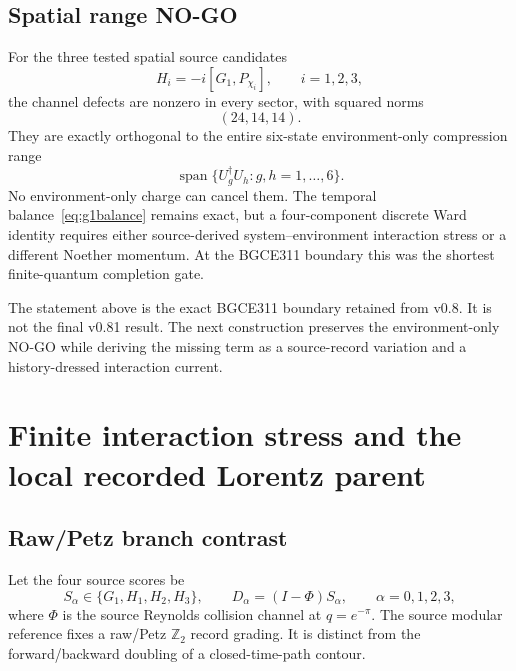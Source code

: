 \documentclass[11pt]{article}
\theoremstyle{definition}
\theoremstyle{remark}
\begin{document}
\subsection{Spatial range NO-GO}

For the three tested spatial source candidates
\begin{equation}
 H_i=-i[G_1,P_{\chi_i}],\qquad i=1,2,3,
\end{equation}
the channel defects are nonzero in every sector, with squared norms
\begin{equation}
 (24,14,14).
\end{equation}
They are exactly orthogonal to the entire six-state environment-only compression range
\begin{equation}
 \operatorname{span}\{U_g^{\dagger}U_h:g,h=1,\ldots,6\}.
\end{equation}
No environment-only charge can cancel them. The temporal balance~\eqref{eq:g1balance} remains exact, but a four-component discrete Ward identity requires either source-derived system--environment interaction stress or a different Noether momentum. At the BGCE311 boundary this was the shortest finite-quantum completion gate.

The statement above is the exact BGCE311 boundary retained from v0.8. It is not the final v0.81 result. The next construction preserves the environment-only NO-GO while deriving the missing term as a source-record variation and a history-dressed interaction current.

\section{Finite interaction stress and the local recorded Lorentz parent}\label{sec:finiteparent081}

\subsection{Raw/Petz branch contrast}

Let the four source scores be
\begin{equation}
 S_\alpha\in\{G_1,H_1,H_2,H_3\},\qquad
 D_\alpha=(I-\Phi)S_\alpha,
 \qquad \alpha=0,1,2,3,
\end{equation}
where $\Phi$ is the source Reynolds collision channel at $q=e^{-\pi}$. The source modular reference fixes a raw/Petz $\mathbb Z_2$ record grading. It is distinct from the forward/backward doubling of a closed-time-path contour.
\end{document}
